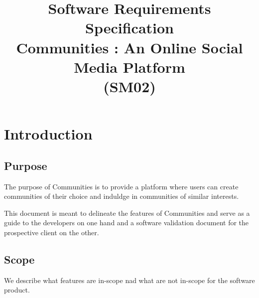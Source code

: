 \documentclass[conference,compsoc]{IEEEtran}
\newcommand{\Name}{Communities }
\begin{document}
\title{Software Requirements Specification\\\Name: An Online Social Media Platform\\(SM02)}

\author{
    \and
    \and
    \and
    }
\maketitle
\IEEEpeerreviewmaketitle

\tableofcontents

\section{Introduction}
\subsection{Purpose}
The purpose of \Name is to provide a platform where users can create communities of their choice and induldge in communities of similar interests.

This document is meant to delineate the features of \Name and serve as a guide to the developers on one hand and a software validation document for the prospective client on the other.

\subsection{Scope}
We describe what features are in-scope nad what are not in-scope for the software product.
\end{document}
